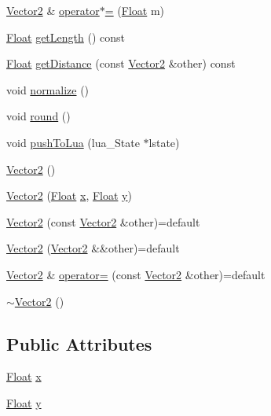 \begin{DoxyCompactItemize}
\item 
\hyperlink{classZeta_1_1Vector2}{Vector2} \& \hyperlink{classZeta_1_1Vector2_a229ef001dfd82827f3ce7a476f405a8f}{operator$\ast$=} (\hyperlink{namespaceZeta_a1e0a1265f9b3bd3075fb0fabd39088ba}{Float} m)
\item 
\hyperlink{namespaceZeta_a1e0a1265f9b3bd3075fb0fabd39088ba}{Float} \hyperlink{classZeta_1_1Vector2_abc566059b609f42e99279c61472ea3e9}{get\+Length} () const 
\item 
\hyperlink{namespaceZeta_a1e0a1265f9b3bd3075fb0fabd39088ba}{Float} \hyperlink{classZeta_1_1Vector2_a9e115140a9520a35fc384b8da80e753a}{get\+Distance} (const \hyperlink{classZeta_1_1Vector2}{Vector2} \&other) const 
\item 
void \hyperlink{classZeta_1_1Vector2_a11cce5bc1c6758033643db2173c07dab}{normalize} ()
\item 
void \hyperlink{classZeta_1_1Vector2_aed74fc5ed1e3185123e6c235fb679047}{round} ()
\item 
void \hyperlink{classZeta_1_1Vector2_a2ac1e36d2358b361d04946dcf4590b4e}{push\+To\+Lua} (lua\+\_\+\+State $\ast$lstate)
\item 
\hyperlink{classZeta_1_1Vector2_ad2477cc67bfa4ecdff1cf32e5d02771d}{Vector2} ()
\item 
\hyperlink{classZeta_1_1Vector2_ac081a62669d27243e83fe111642ff136}{Vector2} (\hyperlink{namespaceZeta_a1e0a1265f9b3bd3075fb0fabd39088ba}{Float} \hyperlink{classZeta_1_1Vector2_a88247cf58be67d2bf4d227b868a0102c}{x}, \hyperlink{namespaceZeta_a1e0a1265f9b3bd3075fb0fabd39088ba}{Float} \hyperlink{classZeta_1_1Vector2_ae6f0b675a313ecd00546812db89a177c}{y})
\item 
\hyperlink{classZeta_1_1Vector2_a21f615b0ce3125dfb1a8c92bb5591d53}{Vector2} (const \hyperlink{classZeta_1_1Vector2}{Vector2} \&other)=default
\item 
\hyperlink{classZeta_1_1Vector2_a76abb9f8e1fc4cd04dd89098c7d5f090}{Vector2} (\hyperlink{classZeta_1_1Vector2}{Vector2} \&\&other)=default
\item 
\hyperlink{classZeta_1_1Vector2}{Vector2} \& \hyperlink{classZeta_1_1Vector2_acada94547909f2915d6ace2f144ccb4c}{operator=} (const \hyperlink{classZeta_1_1Vector2}{Vector2} \&other)=default
\item 
\hyperlink{classZeta_1_1Vector2_a6f2f49107f902f878995b014cab0d4a7}{$\sim$\+Vector2} ()
\end{DoxyCompactItemize}
\subsection*{Public Attributes}
\begin{DoxyCompactItemize}
\item 
\hyperlink{namespaceZeta_a1e0a1265f9b3bd3075fb0fabd39088ba}{Float} \hyperlink{classZeta_1_1Vector2_a88247cf58be67d2bf4d227b868a0102c}{x}
\item 
\hyperlink{namespaceZeta_a1e0a1265f9b3bd3075fb0fabd39088ba}{Float} \hyperlink{classZeta_1_1Vector2_ae6f0b675a313ecd00546812db89a177c}{y}
\end{DoxyCompactItemize}


